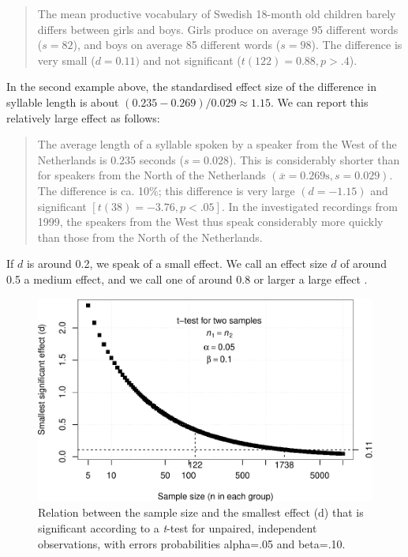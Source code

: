 \documentclass[
]{book}
\begin{document}
\begin{quote}
The mean productive vocabulary of Swedish 18-month old children
barely differs between girls and boys. Girls
produce on average 95 different words (\(s=82\)), and boys
on average 85 different words (\(s=98\)). The difference is very
small (\(d=0.11)\) and not significant (\(t(122)=0.88, p>.4\)).
\end{quote}

In the second example above, the standardised effect size of the difference
in syllable length is about
\((0.235-0.269)/0.029 \approx 1.15\). We can report this relatively large
effect as follows:

\begin{quote}
The average length of a syllable spoken by a speaker from
the West of the Netherlands is \(0.235\) seconds (\(s=0.028\)). This is
considerably shorter than for speakers from the North of the Netherlands
\((\overline{x}=0.269 \textrm{s}, s=0.029)\). The difference is ca. 10\%; this
difference is very large \((d=-1.15)\) and significant
\([t(38)=-3.76, p<.05]\). In the investigated recordings from 1999, the
speakers from the West thus speak considerably more quickly than those from
the North of the Netherlands.
\end{quote}

If \(d\) is around 0.2, we speak of a small effect. We call an effect size
\(d\) of around 0.5 a medium effect, and we call one
of around 0.8 or larger a large effect \citep{Cohen88, Rose08}.

\begin{figure}
\centering
\includegraphics{QMS-EN_files/figure-latex/smallestsignifdifference-1.pdf}
\caption{\label{fig:smallestsignifdifference}Relation between the sample size and the smallest effect (d) that is significant according to a \emph{t}-test for unpaired, independent observations, with errors probabilities alpha=.05 and beta=.10.}
\end{figure}
\end{document}
